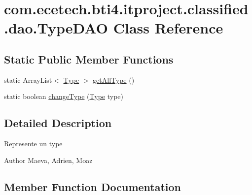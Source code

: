\hypertarget{classcom_1_1ecetech_1_1bti4_1_1itproject_1_1classified_1_1dao_1_1_type_d_a_o}{}\section{com.\+ecetech.\+bti4.\+itproject.\+classified.\+dao.\+Type\+D\+AO Class Reference}
\label{classcom_1_1ecetech_1_1bti4_1_1itproject_1_1classified_1_1dao_1_1_type_d_a_o}
\subsection*{Static Public Member Functions}
\begin{DoxyCompactItemize}
\item 
static Array\+List$<$ \hyperlink{classcom_1_1ecetech_1_1bti4_1_1itproject_1_1classified_1_1beans_1_1_type}{Type} $>$ \hyperlink{classcom_1_1ecetech_1_1bti4_1_1itproject_1_1classified_1_1dao_1_1_type_d_a_o_af69115a81718e0084ae26106a1a54554}{get\+All\+Type} ()
\item 
static boolean \hyperlink{classcom_1_1ecetech_1_1bti4_1_1itproject_1_1classified_1_1dao_1_1_type_d_a_o_ad711aa6be9097446dd6cc991ad3318c9}{change\+Type} (\hyperlink{classcom_1_1ecetech_1_1bti4_1_1itproject_1_1classified_1_1beans_1_1_type}{Type} type)
\end{DoxyCompactItemize}


\subsection{Detailed Description}
Represente un type \begin{DoxyAuthor}{Author}
Maeva, Adrien, Moaz 
\end{DoxyAuthor}


\subsection{Member Function Documentation}
